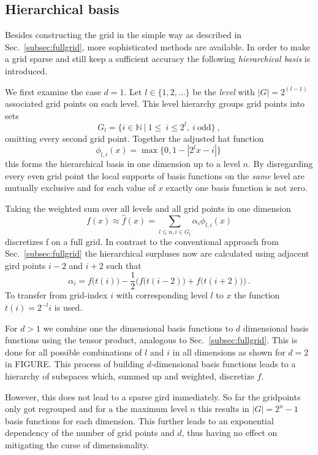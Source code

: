 \subsection{Hierarchical basis}
Besides constructing the grid in the simple way as described in Sec.~\ref{subsec:fullgrid},
more sophisticated methods are available. In order to make a grid
sparse and still keep a sufficient accuracy the following
\emph{hierarchical basis} is introduced.
\par
We first examine the case $d = 1$.
Let $l \in \{1,2,\dots\}$ be the \emph{level} with $|G| = 2^{(l-1)}$ associated
grid points on each level. This level hierarchy groups grid points
into sets
$$G_l = \{i \in \mathbb{N} \ | \ 1 \leq \ i \leq 2^l, \ i \ \text{odd}\} \ ,$$
omitting every second grid point. Together the adjusted hat function
$$\phi_{l,i}(x) = \max\{0, 1 - |2^lx - i|\} \ $$
this forms the hierarchical basis in one dimension up to a level $n$.
By disregarding every
even grid point the local supports of basis functions on the \emph{same}
level are mutually exclusive and for each value of $x$ exactly one basis
function is not zero.
\par
Taking the weighted sum over all levels and all grid points in one dimension
$$ f(x) \approx \hat{f}(x) =  \sum_{l \leq n, i \in G_l}{\alpha_i\phi_{l,i}(x)}$$
discretizes f on a full grid. In contrast to the conventional approach from
Sec.~\ref{subsec:fullgrid} the hierarchical surpluses now are calculated using adjacent
gird points $i - 2$ and $i + 2$ such that
$$ \alpha_i = f\big(t(i)\big) - \frac{1}{2}\bigg(f\big(t(i - 2)\big) + f\big(t(i + 2)\big)\bigg) \ .$$
To transfer from grid-index $i$ with corresponding level $l$ to $x$
the function $t(i) = 2^{-l}i$ is used.
\par
For $d > 1$ we combine one the dimensional basis functions
to $d$ dimensional basis functions using the tensor product,
analogous to Sec.~\ref{subsec:fullgrid}. This is done for all possible combinations
of $l$ and $i$ in all dimensions as shown for $d = 2$ in FIGURE.
This process of building $d$-dimensional basis functions leads to a
hierarchy of subspaces which, summed up and weighted, discretize $f$.
\par
However, this does not lead to a sparse gird immediately. So far the
gridpoints only got regrouped and for a the maximum level $n$ this
results in $|G| = 2^{n} - 1$ basis functions for each dimension.
This further leads to an exponential dependency of the number of grid points
and $d$, thus having no effect on mitigating the curse of dimensionality.

